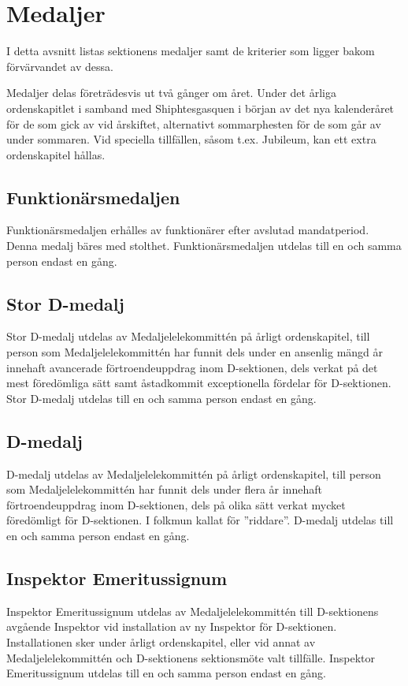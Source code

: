 \documentclass[pdfbookmarks,a4paper,11pt]{article}
\begin{document}
\section{Medaljer}

I detta avsnitt listas sektionens medaljer samt de kriterier som ligger bakom förvärvandet av dessa.

Medaljer delas företrädesvis ut två gånger om året. Under det årliga ordenskapitlet i samband med Shiphtesgasquen i början av det nya kalenderåret för de som gick av vid årskiftet, alternativt sommarphesten för de som går av under sommaren. Vid speciella tillfällen, såsom t.ex. Jubileum, kan ett extra ordenskapitel hållas.

\subsection{Funktionärsmedaljen}
Funktionärsmedaljen erhålles av funktionärer efter avslutad mandatperiod. Denna medalj bäres med stolthet. Funktionärsmedaljen utdelas till en och samma person endast en gång.

\subsection{Stor D-medalj}
Stor D-medalj utdelas av Medaljelelekommittén på årligt ordenskapitel, till person som Medaljelelekommittén har funnit dels under en ansenlig mängd år innehaft avancerade förtroendeuppdrag inom D-sektionen, dels verkat på det mest föredömliga sätt samt åstadkommit exceptionella fördelar för D-sektionen. Stor D-medalj utdelas till en och samma person endast en gång.

\subsection{D-medalj}
D-medalj utdelas av Medaljelelekommittén på årligt ordenskapitel, till person som Medaljelelekommittén har funnit dels under flera år innehaft förtroendeuppdrag inom D-sektionen, dels på olika sätt verkat mycket föredömligt för D-sektionen. I folkmun kallat för ''riddare''. D-medalj utdelas till en och samma person endast en gång.

\subsection{Inspektor Emeritussignum}
Inspektor Emeritussignum utdelas av Medaljelelekommittén till D-sektionens avgående Inspektor vid installation av ny Inspektor för D-sektionen. Installationen sker under årligt ordenskapitel, eller vid annat av Medaljelelekommittén och D-sektionens sektionsmöte valt tillfälle. Inspektor Emeritussignum utdelas till en och samma person endast en gång.
\end{document}
